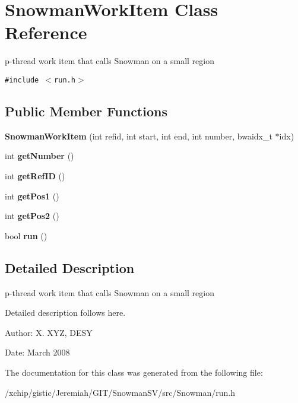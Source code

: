 \section{Snowman\-Work\-Item Class Reference}
\label{classSnowmanWorkItem}
p-thread work item that calls Snowman on a small region  


{\tt \#include $<$run.h$>$}

\subsection*{Public Member Functions}
\begin{CompactItemize}
\item 
\textbf{Snowman\-Work\-Item} (int refid, int start, int end, int number, bwaidx\_\-t $\ast$idx)\label{classSnowmanWorkItem_44e09c55277f8a229a03d96b9040793d}

\item 
int \textbf{get\-Number} ()\label{classSnowmanWorkItem_17dc850b096e2bf1e7a9cc9c14074554}

\item 
int \textbf{get\-Ref\-ID} ()\label{classSnowmanWorkItem_17980a9c0e777efbf5176ec0d4c3e5b7}

\item 
int \textbf{get\-Pos1} ()\label{classSnowmanWorkItem_c15da4f8a4621ada0751f9c4c36bd15e}

\item 
int \textbf{get\-Pos2} ()\label{classSnowmanWorkItem_1c95cf04d0dc5205a389716e4b3b2bad}

\item 
bool \textbf{run} ()\label{classSnowmanWorkItem_b3f388b21eab0af5a3f36f2750f5f3c6}

\end{CompactItemize}


\subsection{Detailed Description}
p-thread work item that calls Snowman on a small region 

Detailed description follows here. \begin{Desc}
\item[Author:]X. XYZ, DESY \end{Desc}
\begin{Desc}
\item[Date:]March 2008 \end{Desc}




The documentation for this class was generated from the following file:\begin{CompactItemize}
\item 
/xchip/gistic/Jeremiah/GIT/Snowman\-SV/src/Snowman/run.h\end{CompactItemize}
